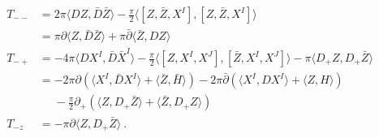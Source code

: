 \documentclass[12pt]{article}
\newcommand{\nn}{\nonumber}
\numberwithin{equation}{section}
\begin{document}
\begin{align}
T_{--}&= {2\pi}  \langle DZ,\bar D\bar Z \rangle -\frac{\pi}{2 }\langle[Z,\bar Z, X^I ],[  Z,\bar Z,X^I ] \rangle \nn\\
& =  {\pi} \partial \langle Z,\bar D\bar Z \rangle+  {\pi} \bar\partial \langle \bar Z, D Z \rangle\nn\\
T_{-+}& = - {4\pi}  \langle DX^I,\bar D\bar X^I \rangle-\frac{\pi}{2}\langle[Z, X^I,X^J],[ \bar Z,X^I,X^J] \rangle -  {\pi}   \langle D_+ Z, D_+\bar Z  \rangle \nn\\
& = -2\pi \partial \left( \langle X^I, \bar{D} X^I \rangle +   \langle \bar{Z}, \bar{H} \rangle \right) - 2\pi \bar{\partial} \left( \langle X^I, D X^I  \rangle +  \langle Z, H \rangle   \right) \nn \\
& \phantom{=} - \frac{\pi}{2 } \partial_+ \left( \langle Z, D_+ \bar{Z} \rangle + \langle \bar{Z}, D_+ Z  \rangle \right) \nn \\
T_{-z} &= - {\pi}  \partial \langle Z, D_+ \bar{Z} \rangle \ .
\end{align}
\end{document}
